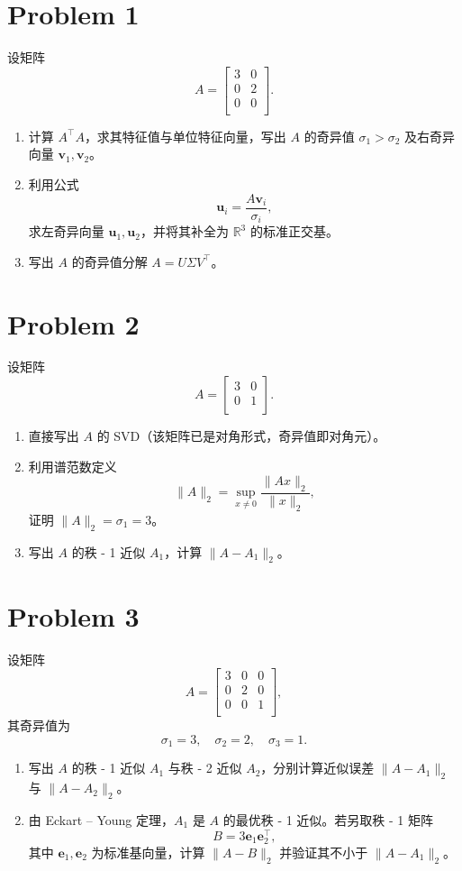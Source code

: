 \section*{Problem 1}

设矩阵 \[
A = \begin{bmatrix}
    3 & 0 \\
    0 & 2 \\
    0 & 0 \\
\end{bmatrix}.
\]
\begin{enumerate}
    \item 计算 $A^\top A$，求其特征值与单位特征向量，写出 $A$ 的奇异值 $\sigma_1 > \sigma_2$ 及右奇异向量 $\boldsymbol{v}_1, \boldsymbol{v}_2$。
    \item 利用公式 \[\boldsymbol{u}_i = \frac{A\boldsymbol{v}_i}{\sigma_i},\] 求左奇异向量 $\boldsymbol{u}_1, \boldsymbol{u}_2$，并将其补全为 $\mathbb{R}^3$ 的标准正交基。
    \item 写出 $A$ 的奇异值分解 $A = U \Sigma V^\top$。
\end{enumerate}

\section*{Problem 2}

设矩阵
\[A =
\begin{bmatrix}
    3 & 0 \\
    0 & 1 \\
\end{bmatrix}.
\]
\begin{enumerate}
    \item 直接写出 $A$ 的 SVD（该矩阵已是对角形式，奇异值即对角元）。
    \item 利用谱范数定义 \[\|A\|_2 = \sup_{x \neq 0} \frac{\|Ax\|_2}{\|x\|_2},\]证明 $\|A\|_2 = \sigma_1 = 3$。
    \item 写出 $A$ 的秩 - 1 近似 $A_1$，计算 $\|A - A_1\|_2$。
\end{enumerate}

\section*{Problem 3}

设矩阵
\[
A =
\begin{bmatrix}
    3 & 0 & 0 \\
    0 & 2 & 0 \\
    0 & 0 & 1 \\
\end{bmatrix},
\]
其奇异值为 \[\sigma_1 = 3, \quad \sigma_2 = 2, \quad \sigma_3 = 1.\]
\begin{enumerate}
    \item 写出 $A$ 的秩 - 1 近似 $A_1$ 与秩 - 2 近似 $A_2$，分别计算近似误差 $\|A - A_1\|_2$ 与 $\|A - A_2\|_2$。
    \item 由 Eckart – Young 定理，$A_1$ 是 $A$ 的最优秩 - 1 近似。若另取秩 - 1 矩阵 \[B = 3 \boldsymbol{e}_1 \boldsymbol{e}_2^\top,\]其中 $\boldsymbol{e}_1, \boldsymbol{e}_2$ 为标准基向量，计算 $\|A - B\|_2$ 并验证其不小于 $\|A - A_1\|_2$。
\end{enumerate}
